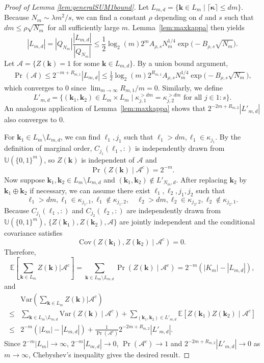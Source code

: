 \documentclass{article}
\theoremstyle{definition}
\renewcommand{\le}{\leqslant}
\renewcommand{\leq}{\leqslant}
\newcommand{\bsk}{\boldsymbol{k}}
\newcommand{\bskappa}{\boldsymbol{\kappa}}
\newcommand{\dunif}{\mathbb{U}}
\newcommand{\e}{\mathbb{E}}
\newcommand{\var}{\mathrm{Var}}
\newcommand{\cov}{\mathrm{Cov}}
\begin{document}
\begin{proof}[Proof of Lemma \ref{lem:generalSUM1bound}]
    Let $L_{m,d}=\{\bsk\in L_m\mid \lceil\bskappa\rceil\le dm\}$. Because $N_m\sim\lambda m^2/s$, we can find a constant $\rho$ depending on $d$ and $s$ such that $dm\leq \rho \sqrt{N_m}$ for all sufficiently large $m$. Lemma~\ref{lem:maxkappa} then yields 
$$|L_{m,d}|=|Q_{N_m}|\frac{|L_{m,d}|}{|Q_{N_m}|}\leq \frac{1}{2}\log_2(m) 2^{m}A_{\rho,s}N_m^{1/4}\exp\Big(-B_{\rho,s}\sqrt{N_m}\Big).$$
Let $\mathcal{A}=\{Z(\bsk)=1\text{ for some } \bsk\in L_{m,d}\}$. By a union bound argument,
\begin{align*}
\Pr(\mathcal{A})\leq 2^{-m+R_{m,1}}|L_{m,d}| 
\leq \frac{1}{2}\log_2(m)2^{R_{m,1}}A_{\rho,s}N_m^{1/4}\exp\Big(-B_{\rho,s}\sqrt{N_m}\Big),
\end{align*}
which converges to $0$ since $\lim_{m\to\infty}R_{m,1}/m=0$. Similarly, we define 
$$L'_{m,d}=\{(\bsk_1,\bsk_2)\in L_{m}\times L_m\mid \kappa^{>dm}_{j,1}=\kappa^{>dm}_{j,2} \text{ for all } j\in 1{:}s\}.$$
An analogous application of Lemma~\ref{lem:maxkappa} shows that $2^{-2m+R_{m,2}}|L'_{m,d}|$ also converges to $0$.

For $\bsk_1\in L_m\setminus L_{m,d}$, we can find $\ell_1,j_1$ such that $\ell_1>dm,\ell_1\in\kappa_{j_1}$. By the definition of marginal order, $C_{j_1}(\ell_1,:)$ is independently drawn from $\dunif(\{0,1\}^m)$, so $Z(\bsk)$ is independent of $\mathcal{A}$ and $$\Pr(Z(\bsk)\mid \mathcal{A}^c)=2^{-m}.$$
Now suppose  $\bsk_1,\bsk_2\in L_{m}\setminus L_{m,d}$ and $(\bsk_1,\bsk_2)\notin L'_{N_m,d}$. After replacing $\bsk_2$ by $\bsk_1\oplus\bsk_2$ if necessary, we can assume there exist $\ell_1,\ell_2,j_1,j_2$ such that 
$$\ell_1>dm,\ell_1\in \kappa_{j_1,1},\ell_1\notin \kappa_{j_1,2}, \quad \ell_2>dm, \ell_2\in \kappa_{j_2,2},\ell_2\notin \kappa_{j_2,1}.$$ Because $C_{j_1}(\ell_1,:)$ and $C_{j_2}(\ell_2,:)$ are independently drawn from $\dunif(\{0,1\}^m)$, $\{Z(\bsk_1),Z(\bsk_2),\mathcal{A}\}$ are jointly independent and the conditional covariance satisfies $$\cov(Z(\bsk_1),Z(\bsk_2)\mid \mathcal{A}^c)=0.$$
Therefore, 
$$\e\left[\sum_{\bsk\in L_{m}}Z(\bsk)\Big\vert \mathcal{A}^c\right]=\sum_{\bsk \in L_{m}\setminus L_{m,d}}\Pr(Z(\bsk)\mid \mathcal{A}^c)=2^{-m}(|K_{m}|-|L_{m,d}|),$$
and
\begin{align*}
&\var\left(\sum_{\bsk\in L_{m}}Z(\bsk)\Big\vert \mathcal{A}^c\right) \\
\le & \sum_{\bsk \in L_{m}\setminus L_{m,d}} \var(Z(\bsk)\mid \mathcal{A}^c)+\sum_{(\bsk_1,\bsk_2)\in L'_{m,d}} \e[Z(\bsk_1)Z(\bsk_2)\mid \mathcal{A}^c ]\\
\leq & 2^{-m}(|L_{m}|-|L_{m,d}|)+\frac{1}{\Pr(\mathcal{A}^c)} 2^{-2m+R_{m,2}}|L'_{m,d}|.
\end{align*}
Since $2^{-m}|L_m|\to\infty$, $2^{-m}|L_{m,d}|\to 0$, $\Pr(\mathcal{A}^c)\to 1$ and $2^{-2m+R_{m,2}}|L'_{m,d}| \to 0$ as $m\to\infty$, Chebyshev's inequality gives the desired result.
\end{proof}
\end{document}
